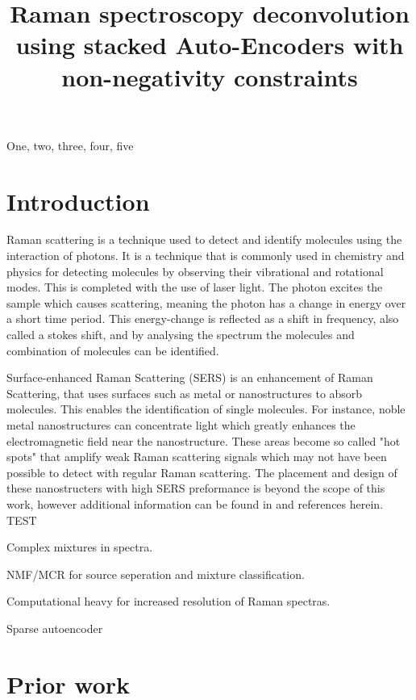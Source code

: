 \documentclass{article}
\title{Raman spectroscopy deconvolution using stacked Auto-Encoders with non-negativity constraints}
\begin{document}
%

\maketitle
%
\begin{abstract}

\end{abstract}
%
\begin{keywords}
One, two, three, four, five
\end{keywords}
%
\section{Introduction}
\label{sec:intro}

Raman scattering is a technique used to detect and identify molecules using the interaction of photons. It is a technique that is commonly used in chemistry and physics for detecting molecules by observing their vibrational and rotational modes. This is completed with the use of laser light. The photon excites the sample which causes scattering, meaning the photon has a change in energy over a short time period. This energy-change is reflected as a shift in frequency, also called a stokes shift, and by analysing the spectrum the molecules and combination of molecules can be identified. 

Surface-enhanced Raman Scattering (SERS) is an enhancement of Raman Scattering, that uses surfaces such as metal or nanostructures to absorb molecules. This enables the identification of single molecules.  For instance, noble metal nanostructures can concentrate light which greatly enhances the electromagnetic field near the nanostructure. These areas become so called "hot spots" that amplify weak Raman scattering signals which may not have been possible to detect with regular Raman scattering. The placement and design of these nanostructers with high SERS preformance is beyond the scope of this work, however additional information can be found in \cite{Wei2013} and references herein. TEST

Complex mixtures in spectra.

NMF/MCR for source seperation and mixture classification.

Computational heavy for increased resolution of Raman spectras.

Sparse autoencoder

\section{Prior work}
\label{sec:prior}
\end{document}
